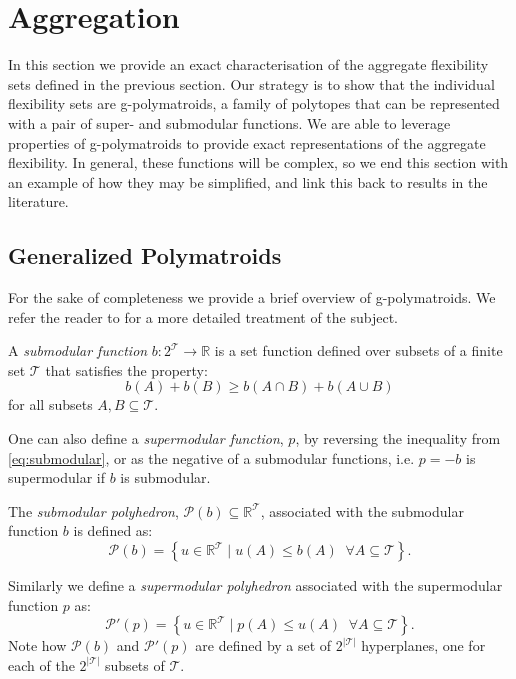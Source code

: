 \section{Aggregation}\label{sec:aggregation}
In this section we provide an exact characterisation of the aggregate flexibility sets defined in the previous section. Our strategy is to show that the individual flexibility sets are g-polymatroids, a family of polytopes that can be represented with a pair of super- and submodular functions. We are able to leverage properties of g-polymatroids to provide exact representations of the aggregate flexibility. In general, these functions will be complex, so we end this section with an example of how they may be simplified, and link this back to results in the literature. 

\subsection{Generalized Polymatroids}
For the sake of completeness we provide a brief overview of g-polymatroids. We refer the reader to \cite{Frank2011ConnectionsOptimization} for a more detailed treatment of the subject.

\begin{definition}\label{dfn:submodular}
    A \emph{submodular function} $b: 2^\mathcal{T} \rightarrow \mathbb{R}$ is a set function defined over subsets of a finite set $\mathcal{T}$ that satisfies the property:
    \begin{equation}\label{eq:submodular}
        b(A) + b(B) \geq b(A \cap B) + b(A \cup B)
    \end{equation}
    for all subsets $A, B \subseteq \mathcal{T}$.
\end{definition}
One can also define a \emph{supermodular function}, $p$, by reversing the inequality from \eqref{eq:submodular}, or as the negative of a submodular functions, i.e. $p = -b$ is supermodular if $b$ is submodular.

\begin{definition}
    The \emph{submodular polyhedron}, $ \mathcal{P}(b) \subseteq \mathbb{R}^{\mathcal{T}}$, associated with the submodular function $b$ is defined as:
\begin{equation*}
     \mathcal{P}(b) = \left\{ u \in  \mathbb{R}^{\mathcal{T}} \mid u(A) \leq b(A) \;\; \forall A \subseteq \mathcal{T}\right\}.
\end{equation*}
\end{definition}
Similarly we define a \emph{supermodular polyhedron} associated with the supermodular function $p$ as:
\begin{equation*}
     \mathcal{P}'(p) = \left\{ u \in  \mathbb{R}^{\mathcal{T}} \mid   p(A) \leq u(A)\;\; \forall A \subseteq \mathcal{T}\right\}.
\end{equation*}
Note how $ \mathcal{P}(b)$ and $ \mathcal{P}'(p)$ are defined by a set of $2^{|\mathcal{T}|}$ hyperplanes, one for each of the $2^{|\mathcal{T}|}$ subsets of $\mathcal{T}$.
 
